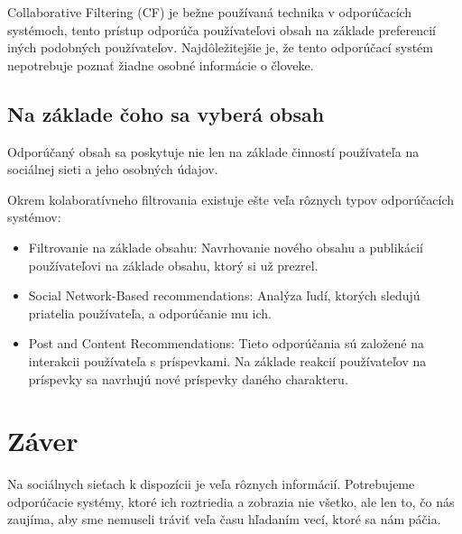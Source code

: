 \documentclass[10pt,twoside,slovak,a4paper]{article}
\begin{document}
Collaborative Filtering (CF) je bežne používaná technika v odporúčacích systémoch, tento prístup odporúča používateľovi obsah na základe preferencií iných podobných používateľov.\cite{dang03}
Najdôležitejšie je, že tento odporúčací systém nepotrebuje poznať žiadne osobné informácie o človeke.



\subsection{Na základe čoho sa vyberá obsah}

Odporúčaný obsah sa poskytuje nie len na základe činností používateľa na sociálnej sieti a jeho osobných údajov.

Okrem kolaboratívneho filtrovania existuje ešte veľa rôznych typov odporúčacích systémov:

\begin{itemize}
\item Filtrovanie na základe obsahu: Navrhovanie nového obsahu a publikácií používateľovi na základe obsahu, ktorý si už prezrel.
\item Social Network-Based recommendations: Analýza ľudí, ktorých sledujú priatelia používateľa, a odporúčanie mu ich.
\item Post and Content Recommendations: Tieto odporúčania sú založené na interakcii používateľa s príspevkami. Na základe reakcií používateľov na príspevky sa navrhujú nové príspevky daného charakteru.
\end{itemize}



\section{Záver} \label{zaver}

Na sociálnych sieťach k dispozícii je veľa rôznych informácií. Potrebujeme odporúčacie systémy, ktoré ich roztriedia a zobrazia nie všetko, ale len to, čo nás zaujíma, aby sme nemuseli tráviť veľa času hľadaním vecí, ktoré sa nám páčia.




\end{document}
